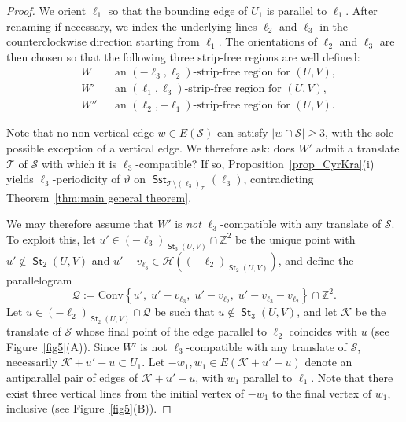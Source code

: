 \documentclass[12pt]{amsart}
\numberwithin{equation}{section}
\DeclareMathOperator{\st}{\mathsf{St}}
\DeclareMathOperator{\sst}{\mathsf{Sst}}
\newcommand{\bb}[1]{\mathbb{#1}}
\begin{document}
\begin{proof}
\medskip

We orient $\pmb{\ell}_1$ so that the bounding edge of $U_1$ is parallel to $\pmb{\ell}_1$. After renaming if necessary, we index the underlying lines $\ell_2$ and $\ell_3$ in the counterclockwise direction starting from $\pmb{\ell}_1$.  The orientations of $\pmb{\ell}_2$ and $\pmb{\ell}_3$ are then chosen so that the following
three strip-free regions are well defined:
\begin{equation}\label{eq:strip-free-triple-m3}
\left.
\begin{aligned}
&W &&\text{an } (-\pmb{\ell}_3,\pmb{\ell}_2)\text{-strip-free region for }(U,V),\\
&W' &&\text{an } (\pmb{\ell}_1,\pmb{\ell}_3)\text{-strip-free region for }(U,V),\\
&W'' &&\text{an } (\pmb{\ell}_2,-\pmb{\ell}_1)\text{-strip-free region for }(U,V).
\end{aligned}
\right.
\end{equation}

Note that no non-vertical edge $w \in E(\mathcal{S})$
can satisfy $|w \cap \mathcal{S}| \geq 3$, with the sole possible exception
of a vertical edge. We therefore ask: does $W'$ admit a translate $\mathcal{T}$ of $\mathcal{S}$ 
with which it is $\pmb{\ell}_3$-compatible? If so, Proposition~\ref{prop_CyrKra}(i) 
yields $\ell_3$-periodicity of $\vartheta$ on 
$\sst_{\mathcal{T} \setminus (\pmb{\ell}_3)_{\mathcal{T}}}(\pmb{\ell}_3)$, 
contradicting Theorem~\ref{thm:main general theorem}.

We may therefore assume that $W'$ is \emph{not} $\pmb{\ell}_3$-compatible
with any translate of $\mathcal{S}$. To exploit this, let $u' \in
(-\pmb{\ell}_3)_{\st_3(U,V)} \cap \bb{Z}^2$ be the unique point with
$u' \notin \st_2(U,V)$ and $u' - v_{\pmb{\ell}_3} \in
\mathcal{H}((-\pmb{\ell}_2)_{\st_2(U,V)})$, and define the parallelogram
\[
\mathcal{Q} := \mathrm{Conv}\!\left\{
u',\;
u'-v_{\pmb{\ell}_3},\;
u'-v_{\pmb{\ell}_2},\;
u'-v_{\pmb{\ell}_3}-v_{\pmb{\ell}_2}
\right\} \cap \bb{Z}^2.
\]
Let $u \in (-\pmb{\ell}_2)_{\st_2(U,V)} \cap \mathcal{Q}$ be such
that $u \notin \st_3(U,V)$, and let $\mathcal{K}$ be the translate
of $\mathcal{S}$ whose final point of the edge parallel to $\pmb{\ell}_2$ coincides with $u$
(see Figure~\ref{fig5}{\color{red}(A)}). Since $W'$ is not $\pmb{\ell}_3$-compatible with any translate of $\mathcal{S}$, necessarily $\mathcal{K}+u'-u \subset U_1$.
Let $ - w_1, w_1 \in E(\mathcal{K}+u'-u)$ denote an antiparallel pair of edges of $\mathcal{K}+u'-u$,
with $ w_1 $ parallel to $\pmb{\ell}_1$. Note that
there exist three vertical lines from the initial vertex of $-w_1$
to the final vertex of $w_1$, inclusive
(see Figure~\ref{fig5}{\color{red}(B)}).


\end{proof}
\end{document}
